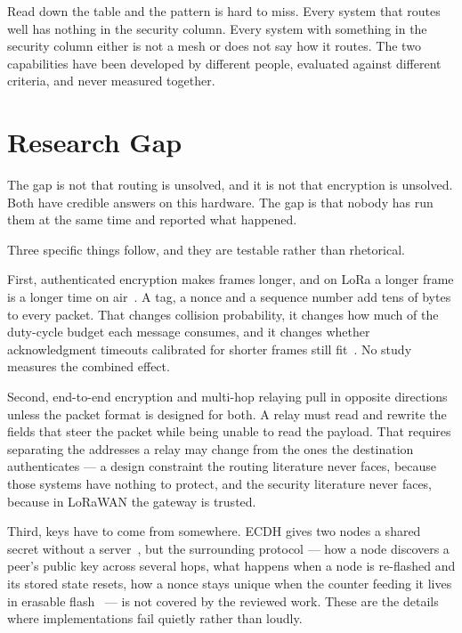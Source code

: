 \documentclass[conference]{IEEEtran}
\begin{document}
Read down the table and the pattern is hard to miss. Every system that routes
well has nothing in the security column. Every system with something in the
security column either is not a mesh or does not say how it routes. The two
capabilities have been developed by different people, evaluated against different
criteria, and never measured together.

\section{Research Gap}\label{sec:gap}

The gap is not that routing is unsolved, and it is not that encryption is
unsolved. Both have credible answers on this hardware. The gap is that nobody has
run them at the same time and reported what happened.

Three specific things follow, and they are testable rather than rhetorical.

First, authenticated encryption makes frames longer, and on LoRa a longer frame
is a longer time on air~\cite{semtech2013toa}. A tag, a nonce and a sequence
number add tens of bytes to every packet. That changes collision probability, it
changes how much of the duty-cycle budget each message consumes, and it changes
whether acknowledgment timeouts calibrated for shorter frames still
fit~\cite{arregui2025gatewayfree}. No study measures the combined effect.

Second, end-to-end encryption and multi-hop relaying pull in opposite directions
unless the packet format is designed for both. A relay must read and rewrite the
fields that steer the packet while being unable to read the payload. That
requires separating the addresses a relay may change from the ones the
destination authenticates — a design constraint the routing literature never
faces, because those systems have nothing to protect, and the security literature
never faces, because in LoRaWAN the gateway is trusted.

Third, keys have to come from somewhere. ECDH gives two nodes a shared secret
without a server~\cite{rfc7748}, but the surrounding protocol — how a node
discovers a peer's public key across several hops, what happens when a node is
re-flashed and its stored state resets, how a nonce stays unique when the counter
feeding it lives in erasable flash~\cite{dworkin2007gcm} — is not covered by the
reviewed work. These are the details where implementations fail quietly rather
than loudly.
\end{document}
